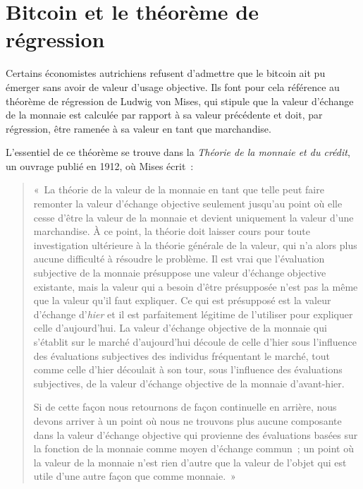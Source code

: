 \section*{Bitcoin et le théorème de régression}

Certains économistes autrichiens refusent d'admettre que le bitcoin ait pu émerger sans avoir de valeur d'usage objective. Ils font pour cela référence au théorème de régression de Ludwig von Mises, qui stipule que la valeur d'échange de la monnaie est calculée par rapport à sa valeur précédente et doit, par régression, être ramenée à sa valeur en tant que marchandise.

L'essentiel de ce théorème se trouve dans la \emph{Théorie de la monnaie et du crédit}, un ouvrage publié en 1912, où Mises écrit~: 

\begin{quote}
«~La théorie de la valeur de la monnaie en tant que telle peut faire remonter la valeur d'échange objective seulement jusqu'au point où elle cesse d'être la valeur de la monnaie et devient uniquement la valeur d'une marchandise. À ce point, la théorie doit laisser cours pour toute investigation ultérieure à la théorie générale de la valeur, qui n'a alors plus aucune difficulté à résoudre le problème. Il est vrai que l'évaluation subjective de la monnaie présuppose une valeur d'échange objective existante, mais la valeur qui a besoin d'être présupposée n'est pas la même que la valeur qu'il faut expliquer. Ce qui est présupposé est la valeur d'échange d'\emph{hier} et il est parfaitement légitime de l'utiliser pour expliquer celle d'aujourd'hui. La valeur d'échange objective de la monnaie qui s'établit sur le marché d'aujourd'hui découle de celle d'hier sous l'influence des évaluations subjectives des individus fréquentant le marché, tout comme celle d'hier découlait à son tour, sous l'influence des évaluations subjectives, de la valeur d'échange objective de la monnaie d'avant-hier.

Si de cette façon nous retournons de façon continuelle en arrière, nous devons arriver à un point où nous ne trouvons plus aucune composante dans la valeur d'échange objective qui provienne des évaluations basées sur la fonction de la monnaie comme moyen d'échange commun~; un point où la valeur de la monnaie n'est rien d'autre que la valeur de l'objet qui est utile d'une autre façon que comme monnaie.~» %
\end{quote}
 
